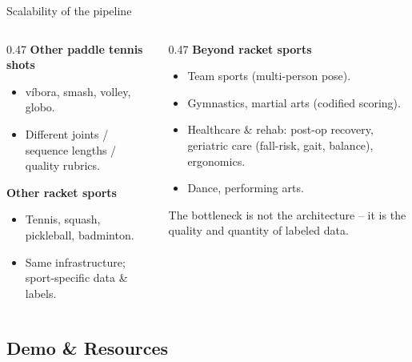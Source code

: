 \begin{frame}{Scalability of the pipeline}
\begin{columns}[T,onlytextwidth]
\begin{column}{0.47\textwidth}
\textbf{\color{tecdark}Other paddle tennis shots}
\begin{itemize}\small
    \item v\'ibora, smash, volley, globo.
    \item Different joints / sequence lengths / quality rubrics.
\end{itemize}
\vspace{8pt}
\textbf{\color{tecdark}Other racket sports}
\begin{itemize}\small
    \item Tennis, squash, pickleball, badminton.
    \item Same infrastructure; sport-specific data \& labels.
\end{itemize}
\end{column}
\hspace{0.02\textwidth}
\begin{column}{0.47\textwidth}
\textbf{\color{tecdark}Beyond racket sports}
\begin{itemize}\small
    \item Team sports (multi-person pose).
    \item Gymnastics, martial arts (codified scoring).
    \item Healthcare \& rehab: post-op recovery, \alert{geriatric care} (fall-risk, gait, balance), ergonomics.
    \item Dance, performing arts.
\end{itemize}
\vspace{8pt}
\begin{infoBox}\scriptsize
The bottleneck is \alert{not} the architecture -- it is the quality and quantity of labeled data.
\end{infoBox}
\end{column}
\end{columns}
\end{frame}

\subsection{Demo \& Resources}

